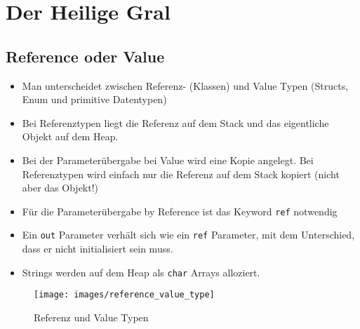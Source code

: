 


\newcommand{\SUBJECT}{Zusammenfassung}
\newcommand{\TITLE}{Microsoft Technologien}




\lstset{style=visual-studio-style}

\section{Der Heilige Gral}
\subsection{Reference oder Value}
\begin{itemize}
	\item Man unterscheidet zwischen Referenz- (Klassen) und Value Typen (Structs, Enum und primitive Datentypen)
	\item Bei Referenztypen liegt die Referenz auf dem Stack und das eigentliche Objekt auf dem Heap.
	\item Bei der Parameterübergabe bei Value wird eine Kopie angelegt. Bei Referenztypen wird einfach nur die Referenz auf dem Stack kopiert (nicht aber das Objekt!)
	\item Für die Parameterübergabe by Reference ist das Keyword \lstinline|ref| notwendig
	\item Ein \lstinline|out| Parameter verhält sich wie ein \lstinline|ref| Parameter, mit dem Unterschied, dass er nicht initialisiert sein muss.
	\item Strings werden auf dem Heap als \lstinline|char| Arrays alloziert.
\end{itemize}

\begin{figure}[h!]
\centering
\texttt{[image: images/reference\_value\_type]}
\caption{Referenz und Value Typen}
\label{fig:valuetypes}
\end{figure}

